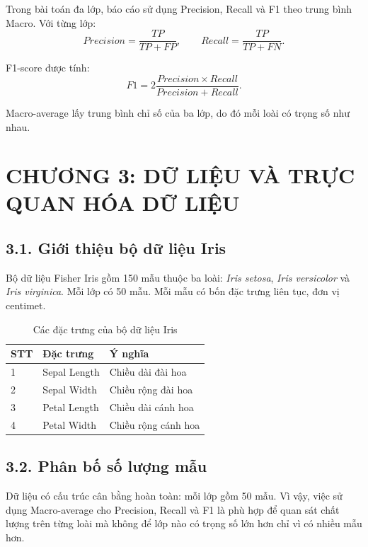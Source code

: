 \documentclass{article}
\begin{document}
	Trong bài toán đa lớp, báo cáo sử dụng Precision, Recall và F1 theo trung bình Macro. Với từng lớp:
	\begin{equation}
		Precision=\frac{TP}{TP+FP},
		\qquad
		Recall=\frac{TP}{TP+FN}.
	\end{equation}
	
	F1-score được tính:
	\begin{equation}
		F1=2\frac{Precision\times Recall}{Precision+Recall}.
	\end{equation}
	
	Macro-average lấy trung bình chỉ số của ba lớp, do đó mỗi loài có trọng số như nhau.
	
	\newpage
	\section{\centering CHƯƠNG 3: DỮ LIỆU VÀ TRỰC QUAN HÓA DỮ LIỆU}
	\subsection{3.1. Giới thiệu bộ dữ liệu Iris}
	\hspace{0.5cm}
	Bộ dữ liệu Fisher Iris gồm 150 mẫu thuộc ba loài: \textit{Iris setosa}, \textit{Iris versicolor} và \textit{Iris virginica}. Mỗi lớp có 50 mẫu. Mỗi mẫu có bốn đặc trưng liên tục, đơn vị centimet.
	
	\begin{table}[H]
		\centering
		\caption{Các đặc trưng của bộ dữ liệu Iris}
		\label{tab:features}
		\begin{tabular}{lll}
			\toprule
			\textbf{STT} & \textbf{Đặc trưng} & \textbf{Ý nghĩa}\\
			\midrule
			1 & Sepal Length & Chiều dài đài hoa\\
			2 & Sepal Width & Chiều rộng đài hoa\\
			3 & Petal Length & Chiều dài cánh hoa\\
			4 & Petal Width & Chiều rộng cánh hoa\\
			\bottomrule
		\end{tabular}
	\end{table}
	
	\subsection{3.2. Phân bố số lượng mẫu}
	\hspace{0.5cm}
	Dữ liệu có cấu trúc cân bằng hoàn toàn: mỗi lớp gồm 50 mẫu. Vì vậy, việc sử dụng Macro-average cho Precision, Recall và F1 là phù hợp để quan sát chất lượng trên từng loài mà không để lớp nào có trọng số lớn hơn chỉ vì có nhiều mẫu hơn.
	
\end{document}
